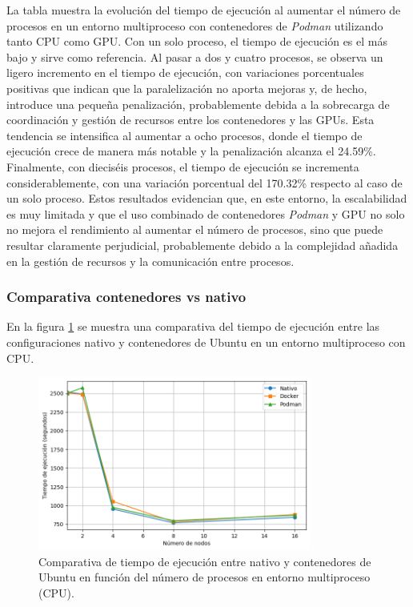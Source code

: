 La tabla muestra la evolución del tiempo de ejecución al aumentar el número de procesos en un entorno multiproceso con contenedores de \textit{Podman} utilizando tanto CPU como GPU. Con un solo proceso, el tiempo de ejecución es el más bajo y sirve como referencia. Al pasar a dos y cuatro procesos, se observa un ligero incremento en el tiempo de ejecución, con variaciones porcentuales positivas que indican que la paralelización no aporta mejoras y, de hecho, introduce una pequeña penalización, probablemente debida a la sobrecarga de coordinación y gestión de recursos entre los contenedores y las GPUs. Esta tendencia se intensifica al aumentar a ocho procesos, donde el tiempo de ejecución crece de manera más notable y la penalización alcanza el 24.59\%. Finalmente, con dieciséis procesos, el tiempo de ejecución se incrementa considerablemente, con una variación porcentual del 170.32\% respecto al caso de un solo proceso. Estos resultados evidencian que, en este entorno, la escalabilidad es muy limitada y que el uso combinado de contenedores \textit{Podman} y GPU no solo no mejora el rendimiento al aumentar el número de procesos, sino que puede resultar claramente perjudicial, probablemente debido a la complejidad añadida en la gestión de recursos y la comunicación entre procesos.

\subsubsection{Comparativa contenedores vs nativo}

En la figura \ref{fig:multi-node_ubuntu_container_vs_native_time} se muestra una comparativa del tiempo de ejecución entre las configuraciones nativo y contenedores de Ubuntu en un entorno multiproceso con CPU.

\begin{figure}[H]
    \centering
    \includegraphics[width=0.8\textwidth]{imagenes/cap5/multi-node_ubuntu_container_vs_native_time.png}
    \caption{Comparativa de tiempo de ejecución entre nativo y contenedores de Ubuntu en función del número de procesos en entorno multiproceso (CPU).}
    \label{fig:multi-node_ubuntu_container_vs_native_time}
\end{figure}

